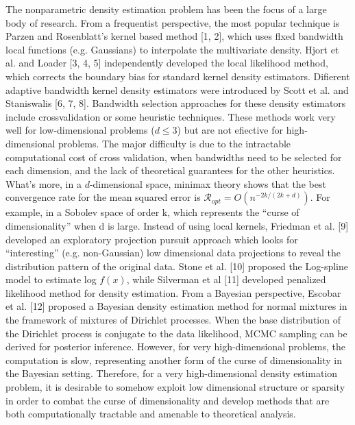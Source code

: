 The nonparametric density estimation problem has been the focus of a large body of research. 
From a frequentist perspective, the most popular technique is Parzen and Rosenblatt’s kernel based method [1, 2], which uses flxed bandwidth local functions (e.g. Gaussians) to interpolate the multivariate density. 
Hjort et al. and Loader [3, 4, 5] independently developed the local likelihood method, which corrects the boundary bias for standard kernel density estimators. 
Difierent adaptive bandwidth kernel density estimators were introduced by Scott et al. and Staniswalis [6, 7, 8]. 
Bandwidth selection approaches for these density estimators include crossvalidation or some heuristic techniques. 
These methods work very well for low-dimensional problems ($d \le 3$) but are not efiective for high-dimensional problems. 
The major difficulty is due to the intractable computational cost of cross validation, when bandwidths need to be selected for each dimension, and the lack of theoretical guarantees for the other heuristics. 
What’s more, in a $d$-dimensional space, minimax theory shows that the best convergence rate for the mean squared error is $\mathcal{R}_{opt} = O(n^{-2k/(2k+d)})$. 
For example, in a Sobolev space of order k, which represents the ``curse of dimensionality'' when d is large. 
Instead of using local kernels, Friedman et al. [9] developed an exploratory projection pursuit approach which looks for ``interesting'' (e.g. non-Gaussian) low dimensional data projections to reveal the distribution pattern of the original data. 
Stone et al. [10] proposed the Log-spline model to estimate log $f(x)$, while Silverman et al [11] developed penalized likelihood method for density estimation. 
From a Bayesian perspective, Escobar et al. [12] proposed a Bayesian density estimation method for normal mixtures in the framework of mixtures of Dirichlet processes. 
When the base distribution of the Dirichlet process is conjugate to the data likelihood, MCMC sampling can be derived for posterior inference. 
However, for very high-dimensional problems, the computation is slow, representing another form of the curse of dimensionality in the Bayesian setting. 
Therefore, for a very high-dimensional density estimation problem, it is desirable to somehow exploit low dimensional structure or sparsity in order to combat the curse of dimensionality and develop methods that are both computationally tractable and amenable to theoretical analysis.

